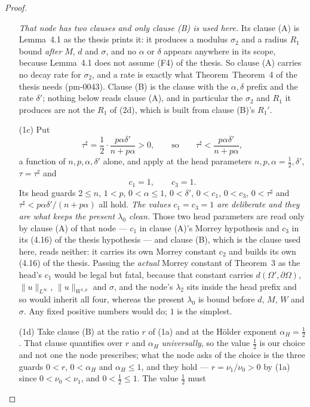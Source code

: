 \begin{proof}
\begin{enumerate}
  \emph{That node has two clauses and only clause \textup{(B)} is used here.}
  Its clause (A) is Lemma~4.1 as the thesis prints it: it produces a modulus
  $\sigma_2$ and a radius $R_1$ bound \emph{after} $M$, $d$ and $\sigma$, and no
  $\alpha$ or $\delta$ appears anywhere in its scope, because Lemma~4.1 does not
  assume (F4) of the thesis.  So clause (A) carries no decay rate for $\sigma_2$, and
  a rate is exactly what Theorem~Theorem~4 of the thesis needs (pm-0043).  Clause (B) is the
  clause with the $\alpha,\delta$ prefix and the rate $\delta'$; nothing below
  reads clause (A), and in particular the $\sigma_2$ and $R_1$ it produces are
  not the $R_1$ of (2d), which is built from clause (B)'s $R_1'$.
\item[(1c)] Put
  \[
  \tau^\sharp=\frac12\cdot\frac{p\alpha\delta'}{n+p\alpha}>0,
  \qquad\text{so}\qquad
  \tau^\sharp<\frac{p\alpha\delta'}{n+p\alpha},
  \]
  a function of $n,p,\alpha,\delta'$ alone, and apply
   at the head parameters
  $n,p,\alpha=\tfrac12,\delta'$, $\tau=\tau^\sharp$ and
  \[
  c_1=1,\qquad c_3=1 .
  \]
  Its head guards $2\le n$, $1<p$, $0<\alpha\le1$, $0<\delta'$, $0<c_1$,
  $0<c_3$, $0<\tau^\sharp$ and $\tau^\sharp<p\alpha\delta'/(n+p\alpha)$ all
  hold.  \emph{The values $c_1=c_3=1$ are deliberate and they are what keeps the
  present $\lambda_0$ clean.}  Those two head parameters are read only by clause
  (A) of that node --- $c_1$ in clause (A)'s Morrey hypothesis and $c_3$ in its
  (4.16) of the thesis hypothesis --- and clause (B), which is the clause used here,
  reads neither: it carries its own Morrey constant $c_2$ and builds its own
  (4.16) of the thesis.  Passing the \emph{actual} Morrey constant of Theorem~3 as
  the head's $c_1$ would be legal but fatal, because that constant carries
  $d(\Omega',\partial\Omega)$, $\|u\|_{L^\infty}$, $\|u\|_{W^{1,p}}$ and
  $\sigma$, and the node's $\lambda_2$ sits inside the head prefix and so would
  inherit all four, whereas the present $\lambda_0$ is bound before $d$, $M$,
  $W$ and $\sigma$.  Any fixed positive numbers would do; $1$ is the simplest.
\item[(1d)] Take clause (B) at the ratio $r$ of (1a) and at the H\"older
  exponent $\alpha_H=\tfrac12$.  That clause quantifies over $r$ and
  $\alpha_H$ \emph{universally}, so the value $\tfrac12$ is our choice and not
  one the node prescribes; what the node asks of the choice is the three guards
  $0<r$, $0<\alpha_H$ and $\alpha_H\le1$, and they hold --- $r=\nu_1/\nu_0>0$ by
  (1a) since $0<\nu_0<\nu_1$, and $0<\tfrac12\le1$.  The value $\tfrac12$ must

\end{enumerate}
\end{proof}
